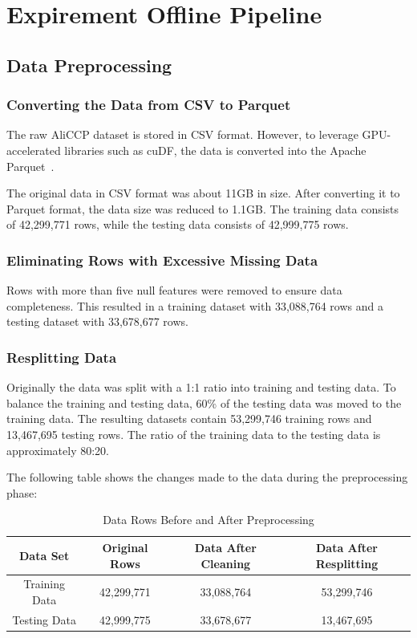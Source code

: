 \section{Expirement Offline Pipeline}

\subsection{Data Preprocessing}

\subsubsection{Converting the Data from CSV to Parquet}

The raw AliCCP dataset is stored in CSV format. However, to leverage GPU-accelerated libraries such as cuDF, the data is converted into the Apache Parquet~\cite{ApacheParquet}.


The original data in CSV format was about 11GB in size. After converting it to Parquet format, the data size was reduced to 1.1GB.
The training data consists of 42,299,771 rows, while the testing data consists of 42,999,775 rows.

\subsubsection{Eliminating Rows with Excessive Missing Data}

Rows with more than five null features were removed to ensure data completeness.
This resulted in a training dataset with 33,088,764 rows and a testing dataset with 33,678,677 rows.

\subsubsection{Resplitting Data}

Originally the data was split with a 1:1 ratio into training and testing data.
To balance the training and testing data, 60\% of the testing data was moved to the training data. 
The resulting datasets contain 53,299,746 training rows and 13,467,695 testing rows.
The ratio of the training data to the testing data is approximately 80:20.


The following table shows the changes made to the data during the preprocessing phase:

\begin{table}[ht]
\centering
\begin{tabular}{|c|c|c|c|}
\hline
\textbf{Data Set} & \textbf{Original Rows} & \textbf{Data After Cleaning} & \textbf{Data After Resplitting} \\
\hline
Training Data & 42,299,771 & 33,088,764 & 53,299,746 \\
\hline
Testing Data & 42,999,775 & 33,678,677 & 13,467,695 \\
\hline
\end{tabular}
\caption{Data Rows Before and After Preprocessing}
\label{tab:data-reprocessing}
\end{table}

